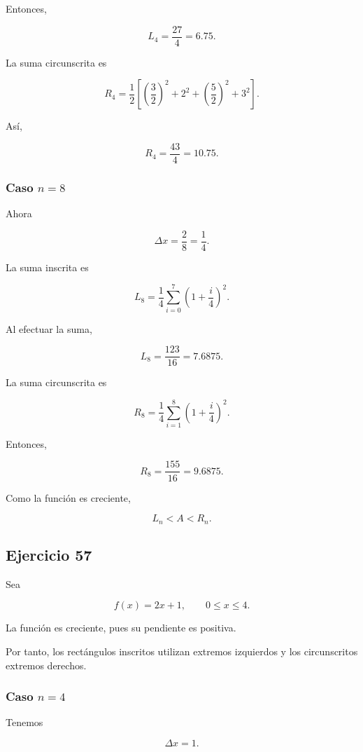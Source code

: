 \documentclass[12pt]{article}
\begin{document}
Entonces,

\[
\boxed{
L_4=\frac{27}{4}=6.75
}.
\]

La suma circunscrita es

\[
R_4
=
\frac12
\left[
\left(\frac32\right)^2+
2^2+
\left(\frac52\right)^2+
3^2
\right].
\]

Así,

\[
\boxed{
R_4=\frac{43}{4}=10.75
}.
\]

\subsubsection*{Caso \(n=8\)}

Ahora

\[
\Delta x
=
\frac{2}{8}
=
\frac14.
\]

La suma inscrita es

\[
L_8
=
\frac14
\sum_{i=0}^{7}
\left(
1+\frac{i}{4}
\right)^2.
\]

Al efectuar la suma,

\[
\boxed{
L_8=\frac{123}{16}=7.6875
}.
\]

La suma circunscrita es

\[
R_8
=
\frac14
\sum_{i=1}^{8}
\left(
1+\frac{i}{4}
\right)^2.
\]

Entonces,

\[
\boxed{
R_8=\frac{155}{16}=9.6875
}.
\]

Como la función es creciente,

\[
\boxed{
L_n<A<R_n
}.
\]

\subsection*{Ejercicio 57}

Sea

\[
f(x)=2x+1,
\qquad
0\leq x\leq4.
\]

La función es creciente, pues su pendiente es positiva.

Por tanto, los rectángulos inscritos utilizan extremos izquierdos y los
circunscritos extremos derechos.

\subsubsection*{Caso \(n=4\)}

Tenemos

\[
\Delta x=1.
\]
\end{document}
